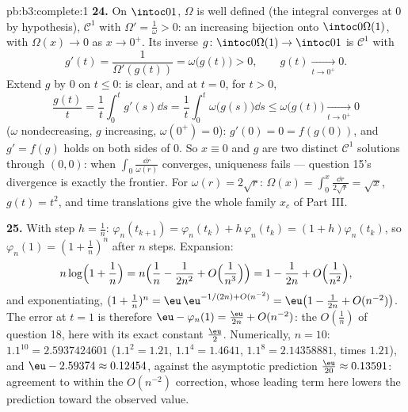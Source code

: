 \begin{solution}{pb:b3:complete:1}
\textbf{24.} On $\intoc01$, $\Omega$ is well defined (the
integral converges at $0$ by hypothesis), $\mathcal C^1$ with
$\Omega' = \frac1\omega > 0$: an increasing bijection onto
$\intoc0{\Omega(1)}$, with $\Omega(x) \to 0$ as $x \to 0^+$.
Its inverse $g \colon \intoc0{\Omega(1)} \to \intoc01$ is
$\mathcal C^1$ with
\[
g'(t) = \frac1{\Omega'(g(t))} = \omega\bigl(g(t)\bigr) > 0,
\qquad g(t) \xrightarrow[t \to 0^+]{} 0 .
\]
Extend $g$ by $0$ on $t \leq 0$:  is clear, and at
$t = 0$, for $t > 0$,
\[
\frac{g(t)}t = \frac1t\int_0^tg'(s)\dd s
= \frac1t\int_0^t\omega\bigl(g(s)\bigr)\dd s
\leq \omega\bigl(g(t)\bigr) \xrightarrow[t\to0^+]{} 0
\]
($\omega$ nondecreasing, $g$ increasing, $\omega(0^+) = 0$):
$g'(0) = 0 = f(g(0))$, and $g' = f(g)$ holds on both sides
of $0$. So $x \equiv 0$ and $g$ are two distinct $\mathcal
C^1$ solutions through $(0, 0)$: when $\int_0\frac{\dd r}
{\omega(r)}$ converges, uniqueness fails --- question 15's
divergence is exactly the frontier. For $\omega(r) = 2\sqrt
r$: $\Omega(x) = \int_0^x\frac{\dd r}{2\sqrt r} = \sqrt x$,
$g(t) = t^2$, and time translations give the whole family
$x_c$ of Part III.

\textbf{25.} With step $h = \frac1n$: $\varphi_n(t_{k+1}) =
\varphi_n(t_k) + h\,\varphi_n(t_k) = (1 + h)\varphi_n(t_k)$,
so $\varphi_n(1) = (1 + \frac1n)^n$ after $n$ steps.
Expansion:
\[
n\log\Bigl(1 + \frac1n\Bigr)
= n\Bigl(\frac1n - \frac1{2n^2} + O\Bigl(\frac1{n^3}\Bigr)
\Bigr) = 1 - \frac1{2n} + O\Bigl(\frac1{n^2}\Bigr),
\]
and exponentiating, $(1 + \frac1n)^n = \eu\,\eu^{-1/(2n) +
O(n^{-2})} = \eu\bigl(1 - \frac1{2n} + O(n^{-2})\bigr)$. The
error at $t = 1$ is therefore $\eu - \varphi_n(1) =
\frac{\eu}{2n} + O(n^{-2})$: the $O(\frac1n)$ of question 18,
here with its exact constant $\frac\eu2$. Numerically, $n =
10$: $1.1^{10} = 2.5937424601$ ($1.1^2 = 1.21$, $1.1^4 =
1.4641$, $1.1^8 = 2.14358881$, times $1.21$), and $\eu -
2.59374 \approx 0.12454$, against the asymptotic prediction
$\frac{\eu}{20} \approx 0.13591$: agreement to within the
$O(n^{-2})$ correction, whose leading term here lowers the
prediction toward the observed value.
\end{solution}
